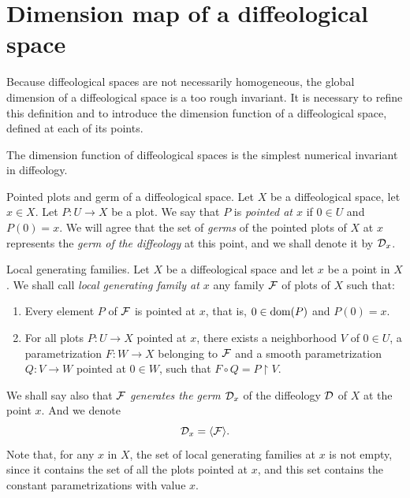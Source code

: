 \section{Dimension map of a diffeological space}

Because diffeological spaces are not necessarily homogeneous,
the global dimension of a diffeological space is a too rough invariant.
It is necessary to refine this definition and to introduce the dimension function of a diffeological space,
defined at each of its points.

The dimension function of diffeological spaces is the simplest numerical invariant in diffeology.

\begin{Article}{Pointed plots and germ of a diffeological space.}{}
  Let $X$ be a diffeological space,
  let $x \in X$.
  Let $P \colon U \to X$ be a plot.
  We say that $P$ is \emph{pointed at $x$} if $0 \in U$ and $P(0) = x$.
  We will agree that the set of \emph{germs} of the pointed plots of $X$ at $x$ represents the \emph{germ of the diffeology} at this point,
  and we shall denote it by $\mathcal{D}_x$.
\end{Article}

\begin{Article}{Local generating families.}{}
  Let $X$ be a diffeological space and let $x$ be a point in $X$.
  We shall call \emph{local generating family at $x$} any family $\mathcal{F}$ of plots of $X$ such that:
  
  \begin{enumerate}
    \item Every element $P$ of $\mathcal{F}$ is pointed at $x$,
    that is,
    $0 \in \mathrm{dom}(P)$ and $P(0) =x$.
    \item For all plots $P \colon U \to X$ pointed at $x$,
    there exists a neighborhood $V$ of $0 \in U$,
    a parametrization $F \colon W \to X$ belonging to $\mathcal{F}$ and a smooth parametrization $Q \colon V \to W$ pointed at $0\in W$,
    such that $F \circ Q = P \restriction V$.
  \end{enumerate}
  
  We shall say also that $\mathcal{F}$ \emph{generates the germ} $\mathcal{D}_x$ of the diffeology $\mathcal{D}$ of $X$ at the point $x$.
  And we denote
  $$%
    \cD_x = \langle \cF \rangle.
    $$%
  Note that,
  for any $x$ in $X$,
  the set of local generating families at $x$ is not empty,
  since it contains the set of all the plots pointed at $x$,
  and this set contains the constant parametrizations with value $x$.
\end{Article}

